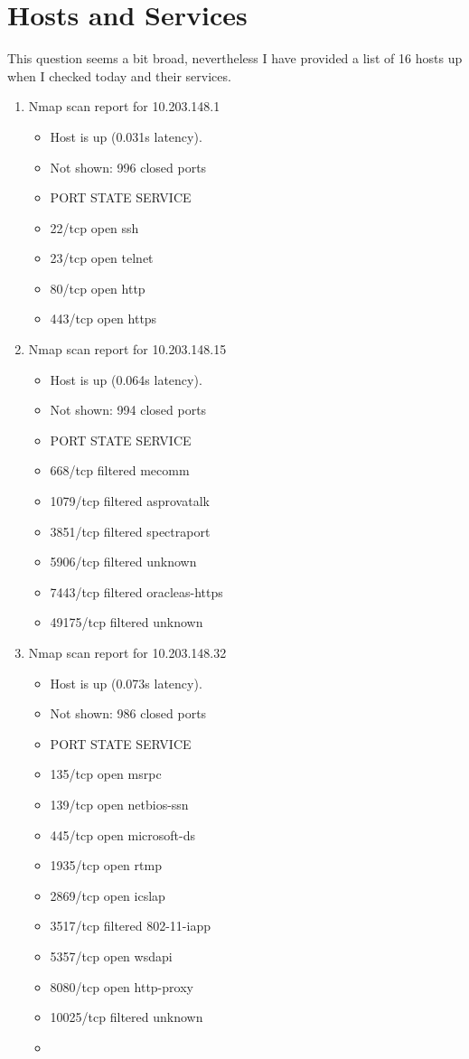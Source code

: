 \documentclass[12pt]{article}
\begin{document}
\section{Hosts and Services}

This question seems a bit broad, nevertheless I have provided a list of 16 hosts up when I checked today and their services.

\begin{enumerate}


\item Nmap scan report for 10.203.148.1
\begin{itemize}


\item Host is up (0.031s latency).
\item Not shown: 996 closed ports
\item PORT    STATE SERVICE
\item 22/tcp  open  ssh
\item 23/tcp  open  telnet
\item 80/tcp  open  http
\item 443/tcp open  https

\end{itemize}

\item Nmap scan report for 10.203.148.15
\begin{itemize}
\item Host is up (0.064s latency).
\item Not shown: 994 closed ports
\item PORT      STATE    SERVICE
\item 668/tcp   filtered mecomm
\item 1079/tcp  filtered asprovatalk
\item 3851/tcp  filtered spectraport
\item 5906/tcp  filtered unknown
\item 7443/tcp  filtered oracleas-https
\item 49175/tcp filtered unknown
\end{itemize}

\item Nmap scan report for 10.203.148.32
\begin{itemize}
\item Host is up (0.073s latency).
\item Not shown: 986 closed ports
\item PORT      STATE    SERVICE
\item 135/tcp   open     msrpc
\item 139/tcp   open     netbios-ssn
\item 445/tcp   open     microsoft-ds
\item 1935/tcp  open     rtmp
\item 2869/tcp  open     icslap
\item 3517/tcp  filtered 802-11-iapp
\item 5357/tcp  open     wsdapi \item 
8080/tcp  open     http-proxy\item 
10025/tcp filtered unknown\item 


\end{itemize}
\end{enumerate}
\end{document}
